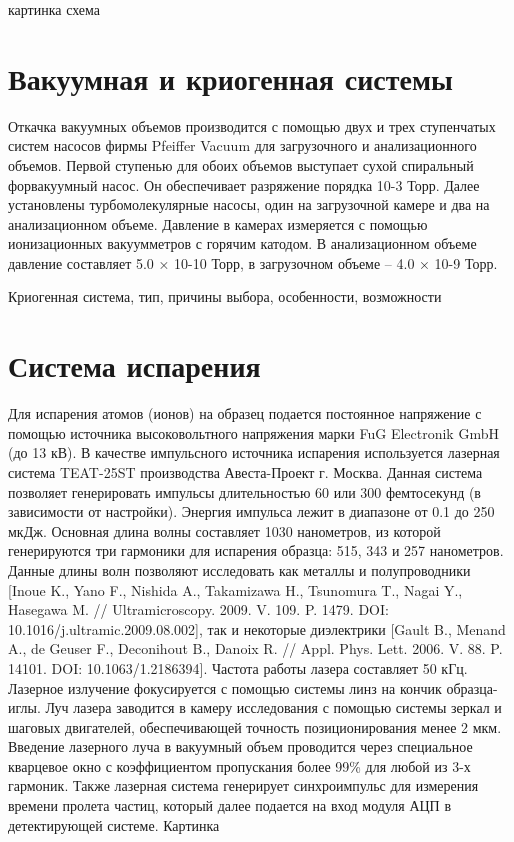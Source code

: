 картинка схема





\FloatBarrier

\section{Вакуумная и криогенная системы}\label{sec:ch2/sec2}

Откачка вакуумных объемов производится с помощью двух и трех ступенчатых систем насосов фирмы Pfeiffer Vacuum для загрузочного и анализационного объемов. Первой ступенью для обоих объемов выступает сухой спиральный форвакуумный насос. Он обеспечивает разряжение порядка 10-3 Торр. Далее установлены турбомолекулярные насосы, один на загрузочной камере и два на анализационном объеме. Давление в камерах измеряется с помощью ионизационных вакуумметров с горячим катодом. В анализационном объеме давление составляет 5.0 × 10-10 Торр, в загрузочном объеме – 4.0 × 10-9 Торр.

Криогенная система, тип, причины выбора, особенности, возможности

\FloatBarrier

\section{Система испарения}\label{sec:ch2/sec3}

Для испарения атомов (ионов) на образец подается постоянное напряжение с помощью источника высоковольтного напряжения марки FuG Electronik GmbH (до 13 кВ). В качестве импульсного источника испарения используется лазерная система TEAT-25ST производства Авеста-Проект г. Москва. Данная система позволяет генерировать импульсы длительностью 60 или 300 фемтосекунд (в зависимости от настройки). Энергия импульса лежит в диапазоне от 0.1 до 250 мкДж. Основная длина волны составляет 1030 нанометров, из которой генерируются три гармоники для испарения образца: 515, 343 и 257 нанометров. Данные длины волн позволяют исследовать как металлы и полупроводники [Inoue K., Yano F., Nishida A., Takamizawa H., Tsunomura T., Nagai Y., Hasegawa M. // Ultramicroscopy. 2009. V. 109. P. 1479. DOI: 10.1016/j.ultramic.2009.08.002], так и некоторые диэлектрики [Gault B., Menand A., de Geuser F., Deconihout B., Danoix R. // Appl. Phys. Lett. 2006. V. 88. P. 14101. DOI: 10.1063/1.2186394]. Частота работы лазера составляет 50 кГц. Лазерное излучение фокусируется с помощью системы линз на кончик образца-иглы. Луч лазера заводится в камеру исследования с помощью системы зеркал и шаговых двигателей, обеспечивающей точность позиционирования менее 2 мкм. Введение лазерного луча в вакуумный объем проводится через специальное кварцевое окно с коэффициентом пропускания более 99\% для любой из 3-х гармоник. Также лазерная система генерирует синхроимпульс для измерения времени пролета частиц, который далее подается на вход модуля АЦП в детектирующей системе.
 Картинка
 
